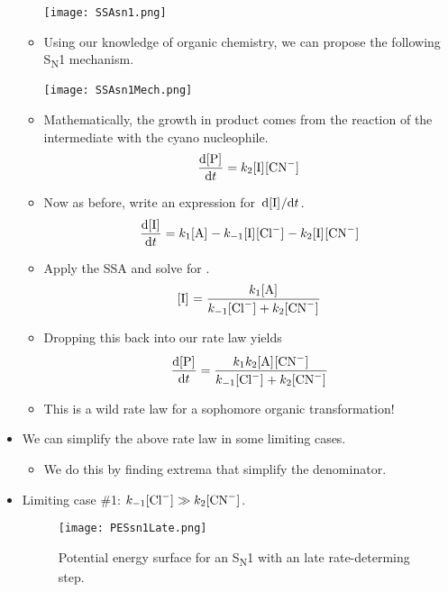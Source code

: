 \documentclass[../notes.tex]{subfiles}
\begin{document}
\begin{itemize}
\begin{itemize}
        \begin{center}
            \texttt{[image: SSAsn1.png]}
        \end{center}
        \item Using our knowledge of organic chemistry, we can propose the following S\textsubscript{N}1 mechanism.
        \begin{center}
            \texttt{[image: SSAsn1Mech.png]}
        \end{center}
        \item Mathematically, the growth in product comes from the reaction of the intermediate with the cyano nucleophile.
        \begin{equation*}
            \dv{\cnc{P}}{t} = k_2\cnc{I}\cnc{CN-}
        \end{equation*}
        \item Now as before, write an expression for $\dv*{\cnc{I}}{t}$.
        \begin{equation*}
            \dv{\cnc{I}}{t} = k_1\cnc{A}-k_{-1}\cnc{I}\cnc{Cl-}-k_2\cnc{I}\cnc{CN-}
        \end{equation*}
        \item Apply the SSA and solve for .
        \begin{equation*}
            \cnc{I} = \frac{k_1\cnc{A}}{k_{-1}\cnc{Cl-}+k_2\cnc{CN-}}
        \end{equation*}
        \item Dropping this back into our rate law yields
        \begin{equation*}
            \dv{\cnc{P}}{t} = \frac{k_1k_2\cnc{A}\cnc{CN-}}{k_{-1}\cnc{Cl-}+k_2\cnc{CN-}}
        \end{equation*}
        \item This is a wild rate law for a sophomore organic transformation!
    \end{itemize}
    \item We can simplify the above rate law in some limiting cases.
    \begin{itemize}
        \item We do this by finding extrema that simplify the denominator.
    \end{itemize}
    \item Limiting case \#1: $k_{-1}\cnc{Cl-}\gg k_2\cnc{CN-}$.
    \begin{figure}[H]
        \centering
        \texttt{[image: PESsn1Late.png]}
        \caption{Potential energy surface for an S\textsubscript{N}1 with an late rate-determing step.}

\end{figure}
\end{itemize}
\end{document}
